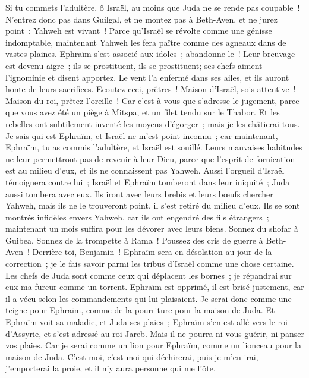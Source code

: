 \begin{multicols}{2}
Si tu commets l'adultère, ô Israël, au moins que Juda ne se rende pas coupable~! N'entrez donc pas dans Guilgal, et ne montez pas à Beth-Aven, et ne jurez point~: Yahweh est vivant~!
Parce qu'Israël se révolte comme une génisse indomptable, maintenant Yahweh les fera paître comme des agneaux dans de vastes plaines.
Ephraïm s'est associé aux idoles~; abandonne-le~!
Leur breuvage est devenu aigre~; ils se prostituent, ils se prostituent; ses chefs aiment l'ignominie et disent apportez.
Le vent l'a enfermé dans ses ailes, et ils auront honte de leurs sacrifices.
\VerseOne{}Ecoutez ceci, prêtres~! Maison d'Israël, sois attentive~! Maison du roi, prêtez l'oreille~! Car c'est à vous que s'adresse le jugement, parce que vous avez été un piège à Mitspa, et un filet tendu sur le Thabor.
Et les rebelles ont subtilement inventé les moyens d'égorger~; mais je les châtierai tous.
Je sais qui est Ephraïm, et Israël ne m'est point inconnu~; car maintenant, Ephraïm, tu as commis l'adultère, et Israël est souillé.
Leurs mauvaises habitudes ne leur permettront pas de revenir à leur Dieu, parce que l'esprit de fornication est au milieu d'eux, et ils ne connaissent pas Yahweh.
Aussi l'orgueil d'Israël témoignera contre lui~; Israël et Ephraïm tomberont dans leur iniquité~; Juda aussi tombera avec eux.
Ils iront avec leurs brebis et leurs bœufs chercher Yahweh, mais ils ne le trouveront point, il s'est retiré du milieu d'eux.
Ils se sont montrés infidèles envers Yahweh, car ils ont engendré des fils étrangers~; maintenant un mois suffira pour les dévorer avec leurs biens.
Sonnez du shofar à Guibea. Sonnez de la trompette à Rama~! Poussez des cris de guerre à Beth-Aven~! Derrière toi, Benjamin~!
Ephraïm sera en désolation au jour de la correction~; je le fais savoir parmi les tribus d'Israël comme une chose certaine.
Les chefs de Juda sont comme ceux qui déplacent les bornes~; je répandrai sur eux ma fureur comme un torrent.
Ephraïm est opprimé, il est brisé justement, car il a vécu selon les commandements qui lui plaisaient.
Je serai donc comme une teigne pour Ephraïm, comme de la pourriture pour la maison de Juda.
Et Ephraïm voit sa maladie, et Juda ses plaies~; Ephraïm s'en est allé vers le roi d'Assyrie, et s'est adressé au roi Jareb. Mais il ne pourra ni vous guérir, ni panser vos plaies.
Car je serai comme un lion pour Ephraïm, comme un lionceau pour la maison de Juda. C'est moi, c'est moi qui déchirerai, puis je m'en irai, j'emporterai la proie, et il n'y aura personne qui me l'ôte.

\end{multicols}
